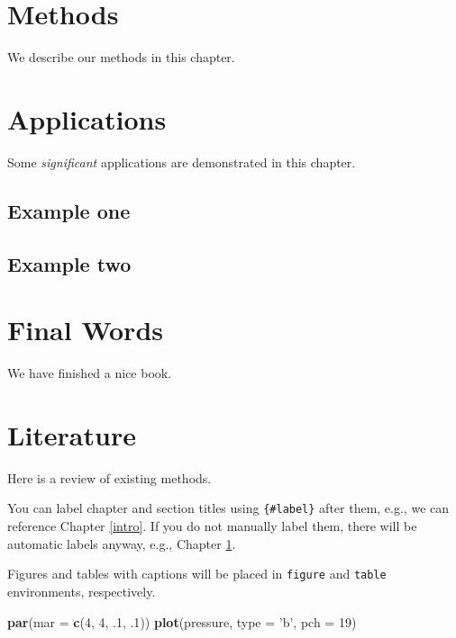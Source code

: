 \documentclass[
]{article}
\newenvironment{Shaded}{\begin{snugshade}}{\end{snugshade}}
\newcommand{\DataTypeTok}[1]{\textcolor[rgb]{0.13,0.29,0.53}{#1}}
\newcommand{\DecValTok}[1]{\textcolor[rgb]{0.00,0.00,0.81}{#1}}
\newcommand{\FloatTok}[1]{\textcolor[rgb]{0.00,0.00,0.81}{#1}}
\newcommand{\KeywordTok}[1]{\textcolor[rgb]{0.13,0.29,0.53}{\textbf{#1}}}
\newcommand{\NormalTok}[1]{#1}
\newcommand{\StringTok}[1]{\textcolor[rgb]{0.31,0.60,0.02}{#1}}
\begin{document}
\hypertarget{methods}{%
\section{Methods}\label{methods}}

We describe our methods in this chapter.

\hypertarget{applications}{%
\section{Applications}\label{applications}}

Some \emph{significant} applications are demonstrated in this chapter.

\hypertarget{example-one}{%
\subsection{Example one}\label{example-one}}

\hypertarget{example-two}{%
\subsection{Example two}\label{example-two}}

\hypertarget{final-words}{%
\section{Final Words}\label{final-words}}

We have finished a nice book.

\hypertarget{literature}{%
\section{Literature}\label{literature}}

Here is a review of existing methods.

You can label chapter and section titles using \texttt{\{\#label\}} after them, e.g., we can reference Chapter \ref{intro}. If you do not manually label them, there will be automatic labels anyway, e.g., Chapter \ref{methods}.

Figures and tables with captions will be placed in \texttt{figure} and \texttt{table} environments, respectively.

\begin{Shaded}
\begin{Highlighting}[]
\KeywordTok{par}\NormalTok{(}\DataTypeTok{mar =} \KeywordTok{c}\NormalTok{(}\DecValTok{4}\NormalTok{, }\DecValTok{4}\NormalTok{, }\FloatTok{.1}\NormalTok{, }\FloatTok{.1}\NormalTok{))}
\KeywordTok{plot}\NormalTok{(pressure, }\DataTypeTok{type =} \StringTok{'b'}\NormalTok{, }\DataTypeTok{pch =} \DecValTok{19}\NormalTok{)}
\end{Highlighting}
\end{Shaded}
\end{document}
